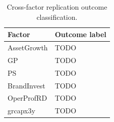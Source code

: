 \begin{table}[htbp]
  \centering
  \caption{Cross-factor replication outcome classification.}
  \label{tab:outcomes}
  \begin{tabular}{ll}
    \toprule
    Factor & Outcome label \\
    \midrule
    AssetGrowth & TODO \\
    GP          & TODO \\
    PS          & TODO \\
    BrandInvest & TODO \\
    OperProfRD  & TODO \\
    grcapx3y    & TODO \\
    \bottomrule
  \end{tabular}
\end{table}
